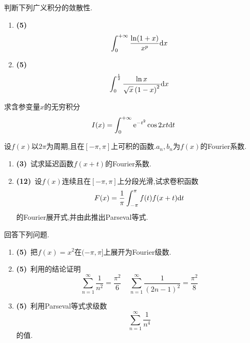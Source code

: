 \documentclass{ctexart}
\begin{document}
\begin{problem}[6.(10\songti{分})]
    判断下列广义积分的敛散性.
    \begin{enumerate}[label=\tbf{(\arabic*)},topsep=0pt,parsep=0pt,itemsep=0pt,partopsep=0pt]
        \item \textbf{(5)}
            \[\int_0^{+\infty}\dfrac{\ln(1+x)}{x^p}\mathrm{d} x\]
        \item \textbf{(5)}
            \[\int_0^{\frac12}\dfrac{\ln x}{\sqrt{x}\left(1-x\right)^2}\mathrm{d} x\]

    \end{enumerate}
\end{problem}

\begin{problem}[7.(10\songti{分})]
    求含参变量$x$的无穷积分
    \[I(x)=\int_0^{+\infty}\mathrm{e}^{-t^2}\cos 2xt\mathrm{d} t\]
\end{problem}

\begin{problem}[8.(15\songti{分})]
    设$f(x)$以$2\pi$为周期,且在$[-\pi,\pi]$上可积的函数.$a_n,b_n$为$f(x)$的Fourier系数.
    \begin{enumerate}[label=\tbf{(\arabic*)},topsep=0pt,parsep=0pt,itemsep=0pt,partopsep=0pt]
        \item \textbf{(3)}\ 试求延迟函数$f(x+t)$的Fourier系数.
        \item \textbf{(12)}\ 设$f(x)$连续且在$[-\pi,\pi]$上分段光滑,试求卷积函数
            \[F(x)=\dfrac{1}{\pi}\int_{-\pi}^{\pi}f(t)f(x+t)\mathrm{d} t\]
            的Fourier展开式,并由此推出Parseval等式.

    \end{enumerate}
\end{problem}
\begin{problem}[9.(15\songti{分})]
    回答下列问题.
    \begin{enumerate}[label=\tbf{(\arabic*)},topsep=0pt,parsep=0pt,itemsep=0pt,partopsep=0pt]
        \item \textbf{(5)}\ 把$f(x)=x^2$在$(-\pi,\pi]$上展开为Fourier级数.
        \item \textbf{(5)}\ 利用的结论证明
            \[\sum_{n=1}^{\infty}\dfrac{1}{n^2}=\dfrac{\pi^2}{6}\ \ \ \ \ \sum_{n=1}^{\infty}\dfrac{1}{(2n-1)^2}=\dfrac{\pi^2}{8}\]
        \item \textbf{(5)}\ 利用Parseval等式求级数
            \[\sum_{n=1}^{\infty}\dfrac{1}{n^4}\]
            的值.
    \end{enumerate}
\end{problem}
\end{document}
